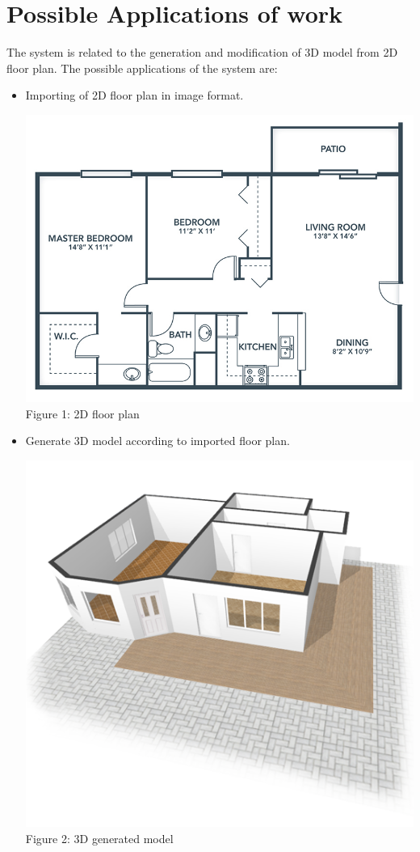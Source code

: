 \documentclass{article}
\begin{document}
\section{Possible Applications of work}
The system is related to the generation and modification of 3D model from 2D floor plan.
The possible applications of the system are:
\begin{itemize}
\item Importing of 2D floor plan in image format.



\begin{center}
\includegraphics[scale=1]{floorplan}
\\Figure 1: 2D floor plan
\end{center}



\item Generate 3D model according to imported floor plan.


\begin{center}
\includegraphics[scale=0.4]{3dmodel}
\\Figure 2: 3D generated model
\end{center}



\end{itemize}
\end{document}
